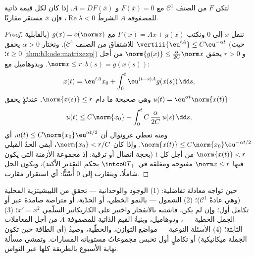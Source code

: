 \begin{theorem}
\label{thm:b3:ode:linearization}
لتكن $F$ من الصنف $\mathcal C^1$ مع $F(\bar x) = 0$ و
$A = DF(\bar x)$. إذا كان لكل قيمة ذاتية للمصفوفة $A$ الشرطُ
$\operatorname{Re}\lambda <
0$، فإن $\bar x$ مستقر مقاربًا.
\end{theorem}

\begin{proof}
ننقل $\bar x$ إلى $0$ ونكتب $F(x) = Ax + g(x)$ مع $g(x) = o(\norm x)$ (بالقابلية
للاشتقاق من الصنف $\mathcal C^1$). ونختار $\alpha > 0$ يحقق
$\vertiii{\eu^{tA}} \leq C\eu^{-\alpha t}$ (حيث $t \geq 0$؛ \cref{thm:b3:ode:matrixexp}) و $r > 0$ يحقق $\norm{g(x)} \leq \frac{\alpha}{2C}\norm x$
من أجل $\norm x \leq
r$. وبدوهاميل مع $b(s) = g(x(s))$:
\[
x(t) = \eu^{tA}x_0 + \int_0^t\eu^{(t-s)A}g(x(s))\,\dd s,
\]
وهي صحيحة ما دام $\norm{x(s)} \leq r$. عندئذٍ يحقق $u(t) =
\eu^{\alpha t}\norm{x(t)}$
\[
u(t) \leq C\norm{x_0} +
\int_0^{t}C\,\frac{\alpha}{2C}\,u(s)\,\dd s ,
\]
ومنه تعطي غرونوال أن $u(t) \leq C\norm{x_0}\eu^{\alpha t/2}$، أي $\norm{x(t)} \leq C\norm{x_0}\eu^{-\alpha t/2}$. وإذا كان $\norm{x_0} < r/C$،
أبقى الحدّ القبلي $\norm{x(t)} <
r$ من أجل كل $t$ (بحجة اتصال أو ترقية:
إذ مجموعة الأزمنة التي يكون فيها $\norm x \leq r$ مفتوحة
ومغلقة في $\intco0{T_+}$ بحكم التقدير الأكيد)، ويكون الحل
شاملًا، ويتقارب إلى $0$ أُسّيًّا: أي استقرار مقارب.
\end{proof}

\begin{method}\label{met:b3:ode:strategy}
حين تواجه معادلة تفاضلية: (1) الوجود والوحدانية --- تحقق من
الليبشيتزية المحلية (وهي عادةً $\mathcal C^1$)؛ (2) الشمول ---
بالنمو الخطي، أو الحدّية، أو متراصة صامدة عبر  أو
تكامل أول؛ وإن لم يكن، فاشتبه بالانفجار واختبر على الكاريكاتير
السلّمي $x' = x^2$؛ (3) الجمل الخطية --- ، ودوهاميل،
وبنيةُ القيم الذاتية للمصفوفة $A$ من أجل المعاملات الثابتة؛
(4) الأسئلة النوعية --- مواضع التوازن، والخطّية، وصيدُ  (أي الطاقة حين تكون الجملة ميكانيكية) أو تكاملٍ أول
تحبس مجموعاتُ مستوياته المسارات. وتمشي مسألة نهاية الأسبوع
بالطريقة كلها عبر النواس.
\end{method}

